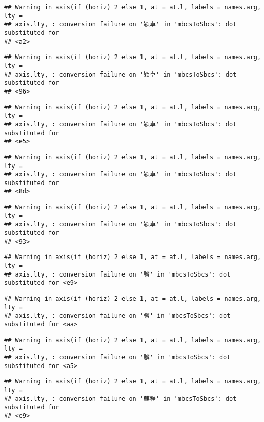 \documentclass[
]{article}
\begin{document}
\begin{verbatim}
## Warning in axis(if (horiz) 2 else 1, at = at.l, labels = names.arg, lty =
## axis.lty, : conversion failure on '颖卓' in 'mbcsToSbcs': dot substituted for
## <a2>
\end{verbatim}

\begin{verbatim}
## Warning in axis(if (horiz) 2 else 1, at = at.l, labels = names.arg, lty =
## axis.lty, : conversion failure on '颖卓' in 'mbcsToSbcs': dot substituted for
## <96>
\end{verbatim}

\begin{verbatim}
## Warning in axis(if (horiz) 2 else 1, at = at.l, labels = names.arg, lty =
## axis.lty, : conversion failure on '颖卓' in 'mbcsToSbcs': dot substituted for
## <e5>
\end{verbatim}

\begin{verbatim}
## Warning in axis(if (horiz) 2 else 1, at = at.l, labels = names.arg, lty =
## axis.lty, : conversion failure on '颖卓' in 'mbcsToSbcs': dot substituted for
## <8d>
\end{verbatim}

\begin{verbatim}
## Warning in axis(if (horiz) 2 else 1, at = at.l, labels = names.arg, lty =
## axis.lty, : conversion failure on '颖卓' in 'mbcsToSbcs': dot substituted for
## <93>
\end{verbatim}

\begin{verbatim}
## Warning in axis(if (horiz) 2 else 1, at = at.l, labels = names.arg, lty =
## axis.lty, : conversion failure on '骥' in 'mbcsToSbcs': dot substituted for <e9>
\end{verbatim}

\begin{verbatim}
## Warning in axis(if (horiz) 2 else 1, at = at.l, labels = names.arg, lty =
## axis.lty, : conversion failure on '骥' in 'mbcsToSbcs': dot substituted for <aa>
\end{verbatim}

\begin{verbatim}
## Warning in axis(if (horiz) 2 else 1, at = at.l, labels = names.arg, lty =
## axis.lty, : conversion failure on '骥' in 'mbcsToSbcs': dot substituted for <a5>
\end{verbatim}

\begin{verbatim}
## Warning in axis(if (horiz) 2 else 1, at = at.l, labels = names.arg, lty =
## axis.lty, : conversion failure on '麒程' in 'mbcsToSbcs': dot substituted for
## <e9>
\end{verbatim}
\end{document}
